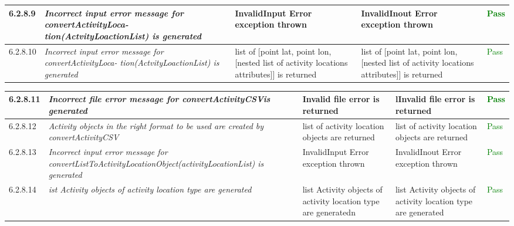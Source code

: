 \documentclass[12pt, titlepage]{article}
\begin{document}
\begin{tabular}[H]{ | m{3.5em} | m{4cm}| m{4cm} | m{4cm} | m{1.2cm} | }
  6.2.8.9 & \textit{Incorrect input error message for convertActivityLoca-
tion(ActvityLoactionList) is generated} & InvalidInput Error exception thrown& InvalidInout Error exception thrown & \textcolor{green}{Pass} \\ 
  \hline

    6.2.8.10 & \textit{Incorrect input error message for convertActivityLoca-
tion(ActvityLoactionList) is generated} & list of [point lat, point lon,[nested list of activity locations attributes]] is returned&list of [point lat, point lon,[nested list of activity locations attributes]] is returned&\textcolor{green}{Pass} \\ 
  \hline
\end{tabular}
\begin{tabular}{ | m{3.5em} | m{4cm}| m{4cm} | m{4cm} | m{1.2cm} | }
\hline
  6.2.8.11 & \textit{Incorrect file error message for convertActivityCSVis generated} & Invalid file error is returned &lInvalid file error is returned&\textcolor{green}{Pass} \\ 
  \hline
  
 6.2.8.12 & \textit{Activity objects in the right format to be used are created by convertActivityCSV} &list of activity location objects are returned&list of activity location objects are returned&\textcolor{green}{Pass} \\ 
  \hline
  6.2.8.13 & \textit{Incorrect input error message for convertListToActivityLocationObject(activityLocationList) is generated} & InvalidInput Error exception thrown& InvalidInout Error exception thrown & \textcolor{green}{Pass} \\ 
  \hline
  6.2.8.14 & \textit{ist Activity objects of activity location type are generated} & list Activity objects of activity location type are generatedn& list Activity objects of activity location type are generated & \textcolor{green}{Pass} \\ 
  \hline

  
\end{tabular}
\end{document}
